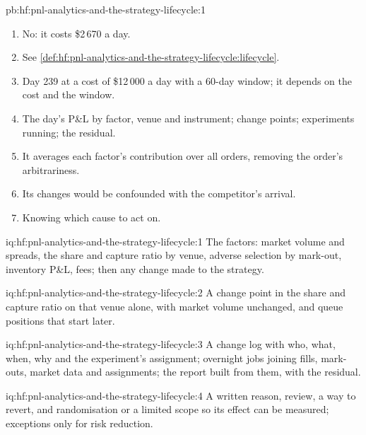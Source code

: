 \begin{solution}{pb:hf:pnl-analytics-and-the-strategy-lifecycle:1}
\begin{enumerate}
$-\$8\,100$ (both), residual about \$20\,000.
\item No: it costs \$2\,670 a day.
\item See \cref{def:hf:pnl-analytics-and-the-strategy-lifecycle:lifecycle}.
\item Day 239 at a cost of \$12\,000 a day with a 60-day window; it depends on the cost and the window.
\item The day's P\&L by factor, venue and instrument; change points; experiments running; the residual.
\item It averages each factor's contribution over all orders, removing the order's arbitrariness.
\item Its changes would be confounded with the competitor's arrival.
\item Knowing which cause to act on.
\end{enumerate}
\end{solution}

\begin{solution}{iq:hf:pnl-analytics-and-the-strategy-lifecycle:1}
The factors: market volume and spreads, the share and capture ratio by venue, adverse selection by mark-out, inventory P\&L, fees; then any change
made to the strategy.
\end{solution}

\begin{solution}{iq:hf:pnl-analytics-and-the-strategy-lifecycle:2}
A change point in the share and capture ratio on that venue alone, with market volume unchanged, and queue positions that start later.
\end{solution}

\begin{solution}{iq:hf:pnl-analytics-and-the-strategy-lifecycle:3}
A change log with who, what, when, why and the experiment's assignment; overnight jobs joining fills, mark-outs, market data and assignments; the
report built from them, with the residual.
\end{solution}

\begin{solution}{iq:hf:pnl-analytics-and-the-strategy-lifecycle:4}
A written reason, review, a way to revert, and randomisation or a limited scope so its effect can be measured; exceptions only for risk reduction.
\end{solution}


